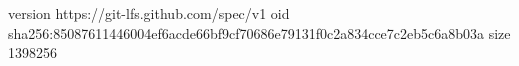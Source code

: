 version https://git-lfs.github.com/spec/v1
oid sha256:85087611446004ef6acde66bf9cf70686e79131f0c2a834cce7c2eb5c6a8b03a
size 1398256
